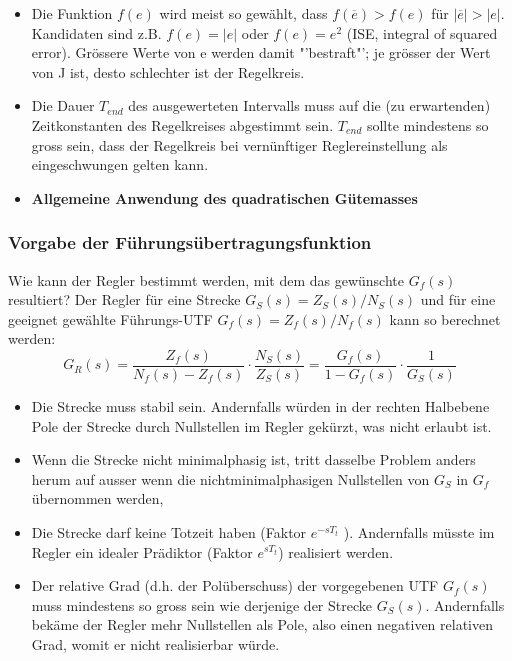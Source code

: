 \begin{itemize}
\item Die Funktion $f(e)$ wird meist so gewählt, dass $f(\overline{e}) > f(e)$ für $|\overline{e}| > |e|$.
Kandidaten sind z.B. $f(e) = |e|$ oder $f(e) = e^2$ (ISE, integral of squared
error). Grössere Werte von e werden damit "'bestraft"'; je grösser der Wert von
J ist, desto schlechter ist der Regelkreis.
\item Die Dauer $T_{end}$ des ausgewerteten Intervalls muss auf die (zu erwartenden)
Zeitkonstanten des Regelkreises abgestimmt sein. $T_{end}$ sollte mindestens so
gross sein, dass der Regelkreis bei vernünftiger Reglereinstellung als eingeschwungen gelten kann.
\item \textbf{Allgemeine Anwendung des quadratischen Gütemasses }
\end{itemize}


\subsubsection{Vorgabe der Führungsübertragungsfunktion }

Wie kann der Regler bestimmt werden, mit dem das gewünschte $G_f(s)$ resultiert?
Der Regler für eine Strecke $G_S(s) = Z_S(s)/N_S(s)$ und für eine geeignet gewählte
Führungs-UTF $G_f(s) = Z_f(s)/N_f(s)$ kann so berechnet werden:
\begin{equation}
\boxed{G_R(s)=\frac{Z_f(s)}{N_f(s)-Z_f(s)}\cdot\frac{N_S(s)}{Z_S(s)}} = \frac{G_f(s)}{1-G_f(s)}\cdot \frac{1}{G_S(s)}
\end{equation}
\begin{itemize}
\item  Die Strecke muss stabil sein. Andernfalls würden in der rechten Halbebene
Pole der Strecke durch Nullstellen im Regler gekürzt, was nicht erlaubt ist.
\item  Wenn die Strecke nicht minimalphasig ist, tritt dasselbe Problem anders herum
auf ausser wenn die nichtminimalphasigen Nullstellen von $G_S$ in $G_f$
übernommen werden, 
\item  Die Strecke darf keine Totzeit haben (Faktor $e^{-sT_t}$ ). Andernfalls müsste im
Regler ein idealer Prädiktor (Faktor $e^{sT_t}$) realisiert werden.
\item  Der relative Grad (d.h. der Polüberschuss) der vorgegebenen UTF $G_f (s)$ muss
mindestens so gross sein wie derjenige der Strecke $G_S(s)$. Andernfalls bekäme
der Regler mehr Nullstellen als Pole, also einen negativen relativen Grad, womit
er nicht realisierbar würde.
\end{itemize}
